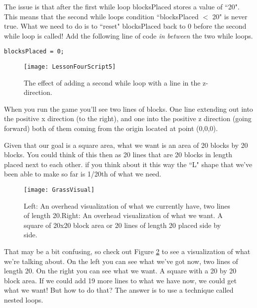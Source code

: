 \documentclass{article}
\begin{document}
The issue is that after the first while loop blocksPlaced stores a value of ``20". This means that the second while loops condition ``blocksPlaced $<$ 20" is never true. What we need to do is to ``reset" blocksPlaced back to 0 before the second while loop is called! Add the following line of code \textit{in between} the two while loops.

\lstset{style=sharpc}
\begin{lstlisting}
blocksPlaced = 0;
\end{lstlisting} 

\begin{figure}
  \texttt{[image: LessonFourScript5]}
  \caption{The effect of adding a second while loop with a line in the z-direction.}
  \label{fig:LessonFourScript5}
\end{figure}

\noindent{}

When you run the game you'll see two lines of blocks. One line extending out into the positive x direction (to the right), and one into the positive z direction (going forward) both of them coming from the origin located at point (0,0,0). 

Given that our goal is a square area, what we want is an area of 20 blocks by 20 blocks. You could think of this then as 20 lines that are 20 blocks in length placed next to each other. if you think about it this way the ``L" shape that we've been able to make so far is 1/20th of what we need. 
\begin{figure}
  \texttt{[image: GrassVisual]}
  \caption{Left: An overhead visualization of what we currently have, two lines of length 20.\newline Right: An overhead visualization of what we want. A square of 20x20 block area or 20 lines of length 20 placed side by side.}
  \label{fig:GrassVisual}
\end{figure}

That may be a bit confusing, so check out Figure \ref{fig:GrassVisual} to see a visualization of what we're talking about. On the left you can see what we've got now, two lines of length 20. On the right you can see what we want. A square with a 20 by 20 block area. If we could add 19 more lines to what we have now, we could get what we want! But how to do that? The answer is to use a technique called nested loops.
\end{document}
